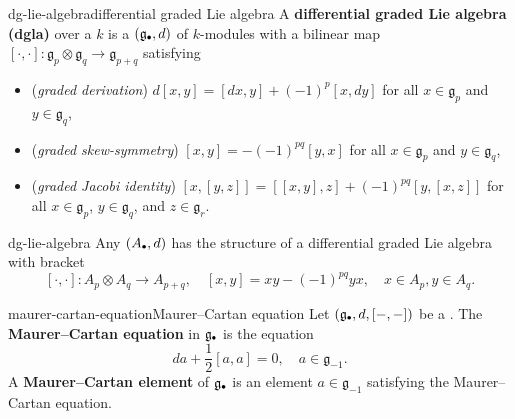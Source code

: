 \begin{topic}{dg-lie-algebra}{differential graded Lie algebra}
    A \textbf{differential graded Lie algebra (dgla)} over a  $k$ is a  $(\mathfrak{g}_\bdot, d)$ of $k$-modules with a bilinear map $[\cdot, \cdot] \colon \mathfrak{g}_p \otimes \mathfrak{g}_q \to \mathfrak{g}_{p + q}$ satisfying
    \begin{itemize}
        \item (\textit{graded derivation}) $d[x, y] = [dx, y] + (-1)^p [x, dy]$ for all $x \in \mathfrak{g}_p$ and $y \in \mathfrak{g}_q$,
        \item (\textit{graded skew-symmetry}) $[x, y] = -(-1)^{pq} [y, x]$ for all $x \in \mathfrak{g}_p$ and $y \in \mathfrak{g}_q$,
        \item (\textit{graded Jacobi identity}) $[x, [y, z]] = [[x, y], z] + (-1)^{pq} [y, [x, z]]$ for all $x \in \mathfrak{g}_p$, $y \in \mathfrak{g}_q$, and $z \in \mathfrak{g}_r$.
    \end{itemize}
\end{topic}

\begin{example}{dg-lie-algebra}
    Any  $(A_\bdot, d)$ has the structure of a differential graded Lie algebra with bracket
    \[ [\cdot, \cdot] \colon A_p \otimes A_q \to A_{p + q}, \quad [x, y] = xy - (-1)^{pq} yx, \quad x \in A_p, y \in A_q . \]
\end{example}

\begin{topic}{maurer-cartan-equation}{Maurer--Cartan equation}
    Let $(\mathfrak{g}_\bdot, d, [-, -])$ be a . The \textbf{Maurer--Cartan equation} in $\mathfrak{g}_\bdot$ is the equation
    \[ da + \frac{1}{2} [a, a] = 0, \quad a \in \mathfrak{g}_{-1} . \]
    A \textbf{Maurer--Cartan element} of $\mathfrak{g}_\bdot$ is an element $a \in \mathfrak{g}_{-1}$ satisfying the Maurer--Cartan equation.
\end{topic}

